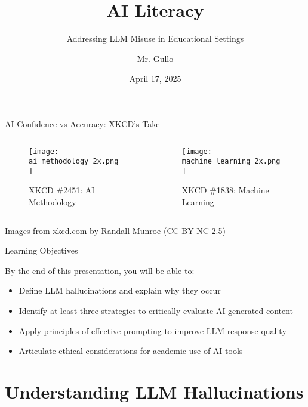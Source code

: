 \documentclass{beamer}
\title[Critical AI Literacy]{AI Literacy}
\subtitle{Addressing LLM Misuse in Educational Settings}
\author[Mr. Gullo]{Mr. Gullo}
\date[April 2025]{April 17, 2025}
\begin{document}
\begin{frame}
\titlepage
\end{frame}

\begin{frame}{AI Confidence vs Accuracy: XKCD's Take}
  \begin{columns}
    \begin{column}{0.48\textwidth}
     \begin{figure}
         \centering
         \texttt{[image: ai\_methodology\_2x.png]}
     
      \caption*{XKCD \#2451: AI Methodology}
      \end{figure}
    \end{column}
    \begin{column}{0.48\textwidth}
      \begin{figure}
          \centering
          \texttt{[image: machine\_learning\_2x.png]}
                \caption*{XKCD \#1838: Machine Learning}
      \end{figure}

    \end{column}
  \end{columns}
  \vspace{0.5cm}
  \tiny{Images from xkcd.com by Randall Munroe (CC BY-NC 2.5)}
\end{frame}

\begin{frame}{Learning Objectives}
\begin{block}{By the end of this presentation, you will be able to:}
\begin{itemize}
  \item{}Define LLM hallucinations and explain why they occur
  \item{}Identify at least three strategies to critically evaluate AI-generated content
  \item Apply principles of effective prompting to improve LLM response quality
  \item Articulate ethical considerations for academic use of AI tools
\end{itemize}
\end{block}
\end{frame}

\section{Understanding LLM Hallucinations}
\end{document}
